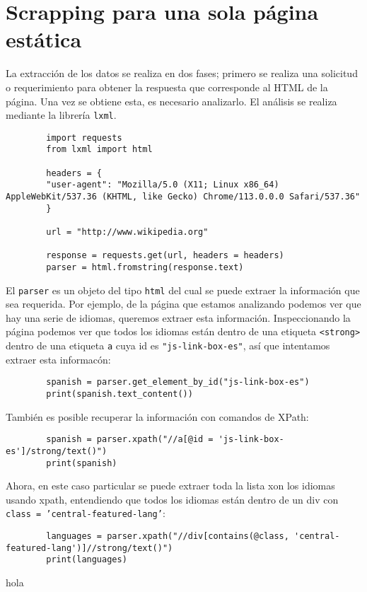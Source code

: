         
    \section{Scrapping para una sola página estática}

    La extracción de los datos se realiza en dos fases; primero se realiza una solicitud o requerimiento para obtener la respuesta que corresponde al HTML de la página. Una vez se obtiene esta, es necesario analizarlo. El análisis se realiza mediante la librería \texttt{lxml}.

    \begin{verbatim}
        import requests
        from lxml import html

        headers = {
        "user-agent": "Mozilla/5.0 (X11; Linux x86_64) AppleWebKit/537.36 (KHTML, like Gecko) Chrome/113.0.0.0 Safari/537.36"
        }

        url = "http://www.wikipedia.org"

        response = requests.get(url, headers = headers)
        parser = html.fromstring(response.text)
    \end{verbatim}

    El \texttt{parser} es un objeto del tipo \texttt{html} del cual se puede extraer la información que sea requerida. Por ejemplo, de la página que estamos analizando podemos ver que hay una serie de idiomas, queremos extraer esta información. Inspeccionando la página podemos ver que todos los idiomas están dentro de una etiqueta \texttt{<strong>} dentro de una etiqueta \texttt{a} cuya id es \texttt{"js-link-box-es"}, así que intentamos extraer esta informacón:

    \begin{verbatim}
        spanish = parser.get_element_by_id("js-link-box-es")
        print(spanish.text_content())
    \end{verbatim}

    También es posible recuperar la información con comandos de XPath:

    \begin{verbatim}
        spanish = parser.xpath("//a[@id = 'js-link-box-es']/strong/text()")
        print(spanish)
    \end{verbatim}

    Ahora, en este caso particular se puede extraer toda la lista xon los idiomas usando xpath, entendiendo que todos los idiomas están dentro de un div con \texttt{class = 'central-featured-lang'}:

    \begin{verbatim}
        languages = parser.xpath("//div[contains(@class, 'central-featured-lang')]//strong/text()")
        print(languages)
    \end{verbatim}

    hola
 